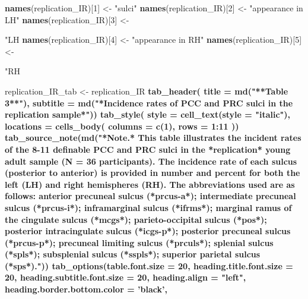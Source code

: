 \documentclass[
]{article}
\newenvironment{Shaded}{\begin{snugshade}}{\end{snugshade}}
\newcommand{\DataTypeTok}[1]{\textcolor[rgb]{0.13,0.29,0.53}{#1}}
\newcommand{\DecValTok}[1]{\textcolor[rgb]{0.00,0.00,0.81}{#1}}
\newcommand{\KeywordTok}[1]{\textcolor[rgb]{0.13,0.29,0.53}{\textbf{#1}}}
\newcommand{\NormalTok}[1]{#1}
\newcommand{\OperatorTok}[1]{\textcolor[rgb]{0.81,0.36,0.00}{\textbf{#1}}}
\newcommand{\StringTok}[1]{\textcolor[rgb]{0.31,0.60,0.02}{#1}}
\begin{document}
\begin{Shaded}
\begin{Highlighting}[]
{{\KeywordTok{names}\NormalTok{(replication_IR)[}\DecValTok{1}\NormalTok{] <-}\StringTok{ "sulci"}
\KeywordTok{names}\NormalTok{(replication_IR)[}\DecValTok{2}\NormalTok{] <-}\StringTok{ "appearance in LH"}
\KeywordTok{names}\NormalTok{(replication_IR)[}\DecValTok{3}\NormalTok{] <-}\StringTok{ "LH %"}
\KeywordTok{names}\NormalTok{(replication_IR)[}\DecValTok{4}\NormalTok{] <-}\StringTok{ "appearance in RH"}
\KeywordTok{names}\NormalTok{(replication_IR)[}\DecValTok{5}\NormalTok{] <-}\StringTok{ "RH %"}


\NormalTok{replication_IR_tab <-}\StringTok{ }\NormalTok{replication_IR }\OperatorTok{%>%}\StringTok{ }\KeywordTok{gt}\NormalTok{() }\OperatorTok{%>%}
\KeywordTok{tab_header}\NormalTok{(}
  \DataTypeTok{title =} \KeywordTok{md}\NormalTok{(}\StringTok{"**Table 3**"}\NormalTok{),}
  \DataTypeTok{subtitle =} \KeywordTok{md}\NormalTok{(}\StringTok{"*Incidence rates of PCC and PRC sulci in the replication sample*"}\NormalTok{)) }\OperatorTok{%>%}
\KeywordTok{tab_style}\NormalTok{(}
    \DataTypeTok{style =} \KeywordTok{cell_text}\NormalTok{(}\DataTypeTok{style =} \StringTok{"italic"}\NormalTok{),}
    \DataTypeTok{locations =} \KeywordTok{cells_body}\NormalTok{(}
      \DataTypeTok{columns =} \KeywordTok{c}\NormalTok{(}\DecValTok{1}\NormalTok{),}
      \DataTypeTok{rows =} \DecValTok{1}\OperatorTok{:}\DecValTok{11}
\NormalTok{    )) }\OperatorTok{%>%}
\KeywordTok{tab_source_note}\NormalTok{(}\KeywordTok{md}\NormalTok{(}\StringTok{"*Note.* This table illustrates the incident rates of the 8-11 definable PCC and PRC sulci in the *replication* young adult sample (N = 36 participants). The incidence rate of each sulcus (posterior to anterior) is provided in number and percent for both the left (LH) and right hemispheres (RH). The abbreviations used are as follows: anterior precuneal sulcus (*prcus-a*); intermediate precuneal sulcus (*prcus-i*); inframarginal sulcus (*ifrms*); marginal ramus of the cingulate sulcus (*mcgs*); parieto-occipital sulcus (*pos*); posterior intracingulate sulcus (*icgs-p*); posterior precuneal sulcus (*prcus-p*); precuneal limiting sulcus (*prculs*); splenial sulcus (*spls*); subsplenial sulcus (*sspls*); superior parietal sulcus (*sps*)."}\NormalTok{)) }\OperatorTok{%>%}
\StringTok{  }\KeywordTok{tab_options}\NormalTok{(}\DataTypeTok{table.font.size =} \DecValTok{20}\NormalTok{,}
    \DataTypeTok{heading.title.font.size =} \DecValTok{20}\NormalTok{,}
    \DataTypeTok{heading.subtitle.font.size =} \DecValTok{20}\NormalTok{,}
    \DataTypeTok{heading.align =} \StringTok{"left"}\NormalTok{,}
    \DataTypeTok{heading.border.bottom.color =} \StringTok{'black'}\NormalTok{,}
}}}}}}}}
\end{Highlighting}
\end{Shaded}
\end{document}
